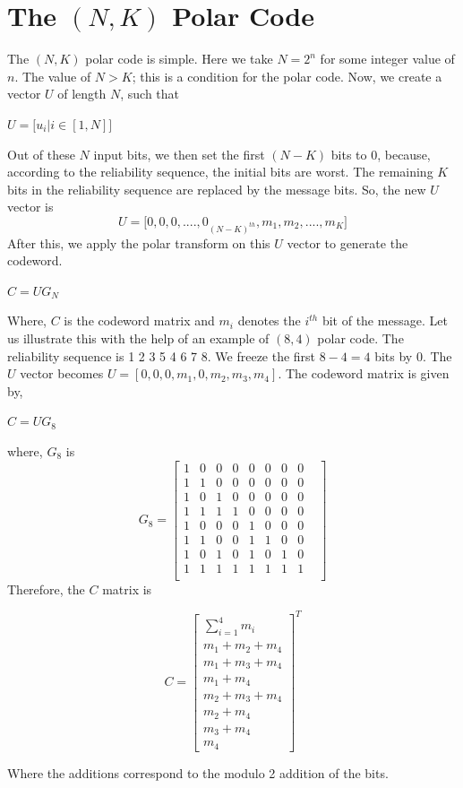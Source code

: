 \documentclass[twocolumn]{report}
\begin{document}
\section{The $(N, K)$ Polar Code}
The $(N, K)$ polar code is simple. Here we take $N = 2^{n}$ for some integer value of $n$. The value of $N>K$; this is a condition for the polar code. Now, we create a vector $U$ of length $N$, such that \begin{center} $U=\Big[u_{i}|i \in [1, N]\Big]$ \end{center}
\par Out of these $N$ input bits, we then set the first $(N-K)$ bits to 0, because, according to the reliability sequence, the initial bits are worst. The remaining $K$ bits in the reliability sequence are replaced by the message bits. So, the new $U$ vector is
\begin{equation}
U = \Big[ 0, 0, 0,...., 0_{(N-K)^{th}}, m_{1}, m_{2}, ...., m_{K} \Big]
\end{equation}
After this, we apply the polar transform on this $U$ vector to generate the codeword.
\begin{center}
$C=UG_{N}$
\end{center}
Where, $C$ is the codeword matrix and $m_{i}$ denotes the $i^{th}$ bit of the message. Let us illustrate this with the help of an example of $(8, 4)$ polar code. The reliability sequence is 1 2 3 5 4 6 7 8. We freeze the first $8-4=4$ bits by 0. The $U$ vector becomes $U=[0, 0, 0, m_{1}, 0, m_{2}, m_{3}, m_{4}]$. The codeword matrix is given by,
\begin{center}
$C = UG_{8}$
\end{center}
where, $G_{8}$ is
\[
G_{8} =
\begin{bmatrix}
1 & 0 & 0 & 0 & 0 & 0 & 0 & 0 \\
1 & 1 & 0 & 0 & 0 & 0 & 0 &0 \\
1 & 0 & 1 & 0 & 0 & 0 & 0 & 0 \\
1 & 1 & 1 & 1 & 0 & 0 & 0 & 0 \\
1 & 0 & 0 & 0 & 1 & 0 &0 &0 \\
1 & 1 & 0 & 0 & 1 & 1 & 0 &0 \\
1 & 0 & 1 & 0 & 1 & 0 &1& 0 \\
1 & 1 & 1 & 1 & 1 & 1 & 1 & 1 &\\
\end{bmatrix}
\]
Therefore, the $C$ matrix is 
\begin{center}
\[
C =
\begin{bmatrix}
\displaystyle \sum_{i=1}^{4}m_{i} \\
m_{1} + m_{2} + m_{4} \\
m_{1} + m_{3} + m_{4} \\
m_{1} + m_{4} \\
m_{2} + m_{3} + m_{4} \\
m_{2} + m_{4} \\
m_{3} + m_{4} \\
m_{4}
\end{bmatrix}
^{T}
\]
\end{center}
Where the additions correspond to the modulo 2 addition of the bits.
\end{document}
